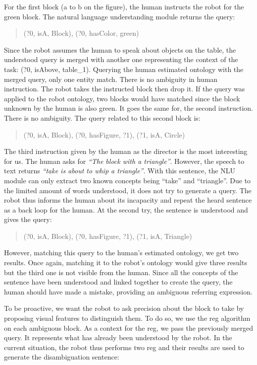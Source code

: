 \documentclass[a4paper,11pt,twoside]{StyleThese}
\begin{document}
For the first block (a to b on the figure), the human instructs the robot for the green block. The natural language understanding module returns the \sparql{} query:

\begin{quote} 
	\centering 
	(?0, isA, Block), (?0, hasColor, green)
\end{quote}

Since the robot assumes the human to speak about objects on the table, the understood query is merged with another one representing the context of the task: (?0, isAbove, table\_1). Querying the human estimated ontology with the merged query, only one entity match. There is no ambiguity in human instruction. The robot takes the instructed block then drop it. If the query was applied to the robot ontology, two blocks would have matched since the block unknown by the human is also green. It goes the same for, the second instruction. There is no ambiguity. The \sparql{} query related to this second block is:

\begin{quote} 
	\centering 
	(?0, isA, Block), (?0, hasFigure, ?1), (?1, isA, Circle)
\end{quote}

The third instruction given by the human as the director is the most interesting for us. The human asks for \textit{``The block with a triangle''}. However, the speech to text returns \textit{``take is about to whip a triangle''}. With this sentence, the NLU module can only extract two known concepts being ``take'' and ``triangle''. Due to the limited amount of words understood, it does not try to generate a \sparql{} query. The robot thus informs the human about its incapacity and repeat the heard sentence as a back loop for the human. At the second try, the sentence is understood and gives the query:

\begin{quote} 
	\centering 
	(?0, isA, Block), (?0, hasFigure, ?1), (?1, isA, Triangle)
\end{quote}

However, matching this query to the human's estimated ontology, we get two results. Once again, matching it to the robot's ontology would give three results but the third one is not visible from the human. Since all the concepts of the sentence have been understood and linked together to create the query, the human should have made a mistake, providing an ambiguous referring expression.

To be proactive, we want the robot to ask precision about the block to take by proposing visual features to distinguish them. To do so, we use the \acrshort{reg} algorithm on each ambiguous block. As a context for the \acrshort{reg}, we pass the previously merged \sparql{} query. It represents what has already been understood by the robot. In the current situation, the robot thus performs two \acrshort{reg} and their results are used to generate the disambiguation sentence:
\end{document}
